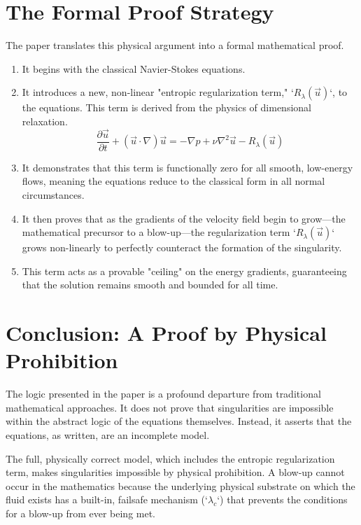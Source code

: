 \documentclass[12pt]{report}
\begin{document}
\section{The Formal Proof Strategy}
The paper translates this physical argument into a formal mathematical proof.
\begin{enumerate}
    \item It begins with the classical Navier-Stokes equations.
    \item It introduces a new, non-linear "entropic regularization term," `$R_\lambda(\vec{u})$`, to the equations. This term is derived from the physics of dimensional relaxation.
    \begin{equation}
    \frac{\partial \vec{u}}{\partial t} + (\vec{u} \cdot \nabla) \vec{u} = -\nabla p + \nu \nabla^2 \vec{u} - R_\lambda(\vec{u})
    \end{equation}
    \item It demonstrates that this term is functionally zero for all smooth, low-energy flows, meaning the equations reduce to the classical form in all normal circumstances.
    \item It then proves that as the gradients of the velocity field begin to grow—the mathematical precursor to a blow-up—the regularization term `$R_\lambda(\vec{u})$` grows non-linearly to perfectly counteract the formation of the singularity.
    \item This term acts as a provable "ceiling" on the energy gradients, guaranteeing that the solution remains smooth and bounded for all time.
\end{enumerate}

\section{Conclusion: A Proof by Physical Prohibition}
The logic presented in the paper is a profound departure from traditional mathematical approaches. It does not prove that singularities are impossible within the abstract logic of the equations themselves. Instead, it asserts that the equations, as written, are an incomplete model.

The full, physically correct model, which includes the entropic regularization term, makes singularities impossible by physical prohibition. A blow-up cannot occur in the mathematics because the underlying physical substrate on which the fluid exists has a built-in, failsafe mechanism (`$\lambda_c$`) that prevents the conditions for a blow-up from ever being met.
\end{document}

